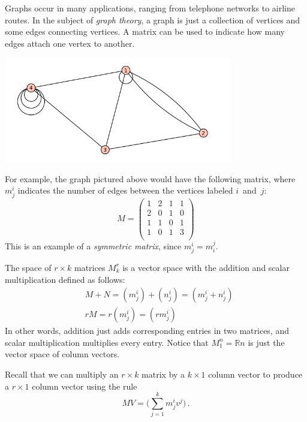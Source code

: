 
\begin{example}
Graphs occur in many applications, ranging from telephone networks to airline routes.  In the subject of \emph{graph theory}, a graph is just a collection of vertices and some edges connecting vertices.  A matrix can be used to indicate how many edges attach one vertex to another.

\begin{center}
\includegraphics[width=10cm]{notes8-0.png}
\end{center}
For example, the graph pictured above would have the following matrix, where $m^i_j$ indicates the number of edges between the vertices labeled $i$~and~$j$:
\[
M = \begin{pmatrix}
1 & 2 & 1 & 1 \\
2 & 0 & 1 & 0 \\
1 & 1 & 0 & 1 \\
1 & 0 & 1 & 3 \\
\end{pmatrix}
\]
This is an example of a \emph{symmetric matrix}, since $m_j^i = m_i^j$.
\end{example}

The space of $r\times k$ matrices $M_k^r$ is a vector space with the addition and scalar multiplication defined as follows:
\begin{align*}
&M+N = (m_j^i) + (n_j^i) = ( m_j^i + n_j^i ) \\
&rM = r(m_j^i) = (rm_j^i)
\end{align*}
In other words, addition just adds corresponding entries in two matrices, and scalar multiplication multiplies every entry.
Notice that $M_1^n = \mathbb{R}n$ is just the vector space of column vectors.

Recall that we can multiply an \(r \times k\) matrix by a \(k \times 1\) column vector to produce a \(r \times 1\) column vector using the rule
\[MV = \big(\sum_{j=1}^k m_j^i v^j\big)\, .\]

